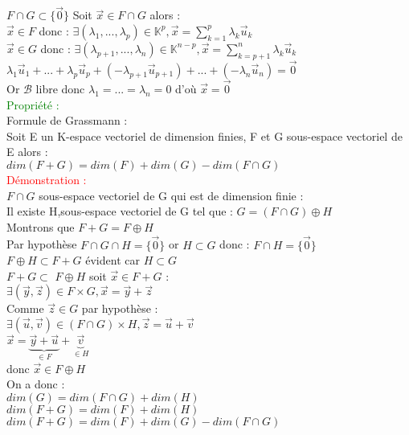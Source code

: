 \documentclass{article}
\begin{document}
{\boldmath $F \cap G \subset \lbrace \vec 0 \rbrace $} Soit $\vec x \in F \cap G$ alors : \\
$\vec x \in F$ donc : $\exists (\lambda_1,...,\lambda_p) \in \mathbb K^p, \vec x= \sum_{k=1}^p \lambda_k \vec u_k$ \\
$\vec x \in G$ donc : $\exists (\lambda_{p+1},...,\lambda_n) \in \mathbb K^{n-p}, \vec x= \sum_{k=p+1}^n \lambda_k \vec u_k$ \\
$\lambda_1 \vec u_1 +... +\lambda_p \vec u_p + (-\lambda_{p+1} \vec u_{p+1})+...+(- \lambda_n \vec u_n)= \vec 0$ \\
Or $\mathcal B$ libre donc $\lambda_1=...=\lambda_n=0$ d'où $\vec x= \vec 0$ \\
\textcolor{green}{Propriété :} \\
Formule de Grassmann : \\
Soit E un K-espace vectoriel de dimension finies, F et G sous-espace vectoriel de E alors : \\
$dim(F+G)=dim(F)+dim(G)-dim(F \cap G)$ \\
\textcolor{red}{Démonstration :} \\
$F \cap G$ sous-espace vectoriel de G qui est de dimension finie : \\
Il existe H,sous-espace vectoriel de G tel que : $G=(F \cap G) \oplus H$ \\
Montrons que $F+G=F \oplus H$ \\
Par hypothèse $F \cap G \cap H =\lbrace \vec 0 \rbrace$ or $H \subset G$ donc : $F \cap H=\lbrace \vec 0 \rbrace$ \\
{\boldmath $F\oplus H \subset F+G$} évident car $H \subset G$ \\
{\boldmath $F+G \subset$ $F \oplus H $} soit $\vec x \in F+G$ : \\
$\exists (\vec y , \vec z) \in F \times G, \vec x =\vec y + \vec z$ \\
Comme $\vec z \in G $ par hypothèse : \\
$\exists (\vec u, \vec v) \in (F \cap G) \times H, \vec z= \vec u + \vec v$ \\
$\vec x= \underbrace{ \vec y +\vec u}_{\in F} + \underbrace{\vec v}_{\in H}$ \\
donc $\vec x \in F \oplus H$ \\
On a donc : \\
$dim(G)=dim(F \cap G) +dim(H)$ \\
$dim(F+G) = dim(F)+ dim(H)$ \\
$dim(F+G)=dim(F)+dim(G)-dim(F \cap G)$
\end{document}
